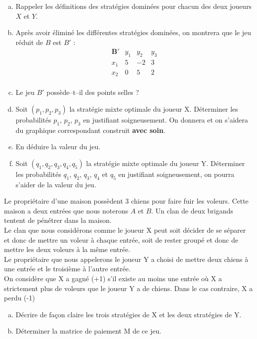 \documentclass[french,11pt,leqno]{article}
\newcounter{exocount}
\newcounter{questcount}
\def\exo{\bigskip\noindent{\bf Exercice \theexocount {} -}
  \addtocounter{exocount}{1} \setcounter{questcount}{1}}
\begin{document}
\begin{enumerate}[a)]%
\item Rappeler les d\'efinitions des strat\'egies domin\'ees pour chacun des deux joueurs $X$ et $Y$. 
\item Apr\`es avoir \'elimin\'e les diff\'erentes strat\'egies domin\'ees, on montrera que 
le jeu r\'eduit de $B$ est $B'$ :
 \begin{equation*}
\begin{array}{l|rrr}
\mathbf{B'} & y_1 & y_2 & y_3 \\ \hline
x_1 & 5 & -2& 3\\
x_2 & 0 & 5& 2\\
\end{array}%
\end{equation*}
\item Le jeu $B'$ poss\`ede--t--il des points selles ? 
\item Soit $(p_1, p_2, p_3)$ la strat\'egie mixte optimale du joueur X. D\'eterminer les probabilit\'es $p_1$, $p_2$, $p_3$ en justifiant soigneusement. 
On donnera et on s'aidera du graphique correspondant construit \textbf{avec soin}. 
\item En d\'eduire la valeur du jeu.
\item Soit $(q_1, q_2, q_3, q_4, q_5)$ la strat\'egie mixte optimale du joueur Y. D\'eterminer les probabilit\'es $q_1$, $q_2$, $q_3$, $q_4$ et $q_5$ en justifiant soigneusement, on pourra 
s'aider de la valeur du jeu. 
\end{enumerate}

\newpage

\exo
Le propri\'etaire d'une maison poss\`edent 3 chiens pour faire fuir les voleurs. 
Cette maison a deux entr\'ees que nous noterons $A$ et $B$. Un clan de deux brigands tentent de p\'en\'etrer dans la maison.\\
Le clan que nous consid\'erons comme le joueur X peut soit d\'ecider de se s\'eparer et donc de mettre un voleur \`a chaque entr\'ee, soit de rester 
group\'e et donc de mettre les deux voleurs \`a la m\^eme entr\'ee.\\ 
Le propri\'etaire que nous appelerons le joueur Y a choisi de mettre deux chiens \`a une entr\'ee et le troisi\`eme \`a l'autre entr\'ee.\\ 
On consid\`ere que X a gagn\'e (+1) s'il existe au moins une entr\'ee o\`u X a strictement plus de voleurs que le joueur Y a de chiens. Dans le cas contraire, X a perdu (-1)
\begin{enumerate}[a)]
\item D\'ecrire de fa\c con claire les trois strat\'egies de X et les deux strat\'egies de Y.
\item D\'eterminer la matrice de paiement M de ce jeu. 
\end{enumerate}
\end{document}
